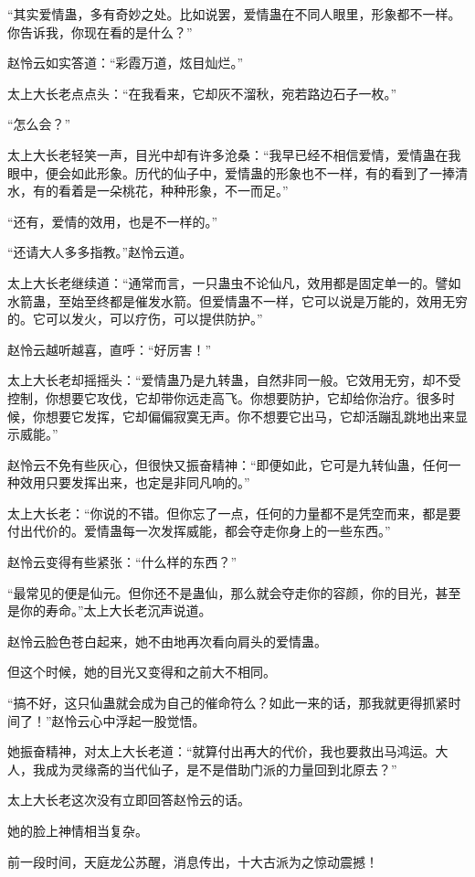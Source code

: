 \begin{this_body}
“其实爱情蛊，多有奇妙之处。比如说罢，爱情蛊在不同人眼里，形象都不一样。你告诉我，你现在看的是什么？”

赵怜云如实答道：“彩霞万道，炫目灿烂。”

太上大长老点点头：“在我看来，它却灰不溜秋，宛若路边石子一枚。”

“怎么会？”

太上大长老轻笑一声，目光中却有许多沧桑：“我早已经不相信爱情，爱情蛊在我眼中，便会如此形象。历代的仙子中，爱情蛊的形象也不一样，有的看到了一捧清水，有的看着是一朵桃花，种种形象，不一而足。”

“还有，爱情的效用，也是不一样的。”

“还请大人多多指教。”赵怜云道。

太上大长老继续道：“通常而言，一只蛊虫不论仙凡，效用都是固定单一的。譬如水箭蛊，至始至终都是催发水箭。但爱情蛊不一样，它可以说是万能的，效用无穷的。它可以发火，可以疗伤，可以提供防护。”

赵怜云越听越喜，直呼：“好厉害！”

太上大长老却摇摇头：“爱情蛊乃是九转蛊，自然非同一般。它效用无穷，却不受控制，你想要它攻伐，它却带你远走高飞。你想要防护，它却给你治疗。很多时候，你想要它发挥，它却偏偏寂寞无声。你不想要它出马，它却活蹦乱跳地出来显示威能。”

赵怜云不免有些灰心，但很快又振奋精神：“即便如此，它可是九转仙蛊，任何一种效用只要发挥出来，也定是非同凡响的。”

太上大长老：“你说的不错。但你忘了一点，任何的力量都不是凭空而来，都是要付出代价的。爱情蛊每一次发挥威能，都会夺走你身上的一些东西。”

赵怜云变得有些紧张：“什么样的东西？”

“最常见的便是仙元。但你还不是蛊仙，那么就会夺走你的容颜，你的目光，甚至是你的寿命。”太上大长老沉声说道。

赵怜云脸色苍白起来，她不由地再次看向肩头的爱情蛊。

但这个时候，她的目光又变得和之前大不相同。

“搞不好，这只仙蛊就会成为自己的催命符么？如此一来的话，那我就更得抓紧时间了！”赵怜云心中浮起一股觉悟。

她振奋精神，对太上大长老道：“就算付出再大的代价，我也要救出马鸿运。大人，我成为灵缘斋的当代仙子，是不是借助门派的力量回到北原去？”

太上大长老这次没有立即回答赵怜云的话。

她的脸上神情相当复杂。

前一段时间，天庭龙公苏醒，消息传出，十大古派为之惊动震撼！


\end{this_body}
